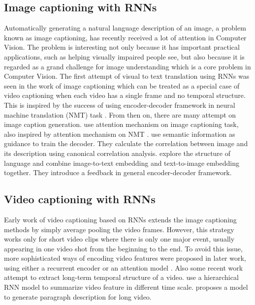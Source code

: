 \subsection{Image captioning with RNNs}
Automatically generating a natural language description of an image, a problem known as image captioning, has recently received a lot of attention in Computer Vision. The problem is interesting not only because it has important practical applications, such as helping visually impaired people see, but also because it is regarded as a grand challenge for image understanding which is a core problem in Computer Vision. The first attempt of visual to text translation using RNNs was seen in the work of image captioning \cite{Mao2014Deep,Vinyals2015Show} which can be treated as a special case of video captioning when each video has a single frame and no temporal structure. This is inspired by the success of using encoder-decoder framework in neural machine translation (NMT) task \cite{cho2014learning}. From then on, there are many attempt on image caption generation. \cite{xu2015show} use attention mechanism on image captioning task, also inspired by attention mechanism on NMT \cite{bahdanau2014neural}. \cite{Jia2015Guiding} use semantic information as guidance to train the decoder. They calculate the correlation between image and its description using canonical correlation analysis. \cite{You2016Image} explore the structure of language and combine image-to-text embedding and text-to-image embedding together. They introduce a feedback in general encoder-decoder framework.

\subsection{Video captioning with RNNs}
Early work of video captioning \cite{venugopalan2014translating} based on RNNs extends the image captioning methods by simply average pooling the video frames. However, this strategy works only for short video clips where there is only one major event, usually appearing in one video shot from the beginning to the end. To avoid this issue, more sophisticated ways of encoding video features were proposed in later work, using either a recurrent encoder \cite{donahue2015long,venugopalan2015sequence,xu2015multi} or an attention model \cite{yao2015describing}. Also some recent work attempt to extract long-term temporal structure of a video. \cite{pan2015hierarchical} use a hierarchical RNN model to summarize video feature in different time scale. \cite{yu2015video} proposes a model to generate paragraph description for long video.


